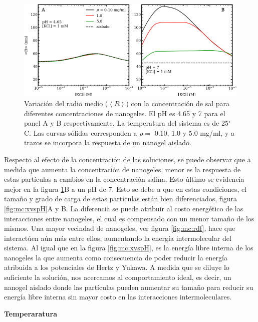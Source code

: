 	\begin{figure}
		\centering
		\includegraphics[width=0.75\linewidth]{Figures/graph-mc/r-salts-pHs.pdf}
		\caption{Variaci\'on del radio medio ($\left<R\right>$) con la concentraci\'on de sal para diferentes concentraciones de nanogeles. El pH es 4.65 y 7 para el panel A y B respectivamente. La temperatura del sistema es de 25$^\circ$C. Las curvas s\'olidas corresponden a $\rho=$ 0.10, 1.0 y 5.0 mg/ml, y a trazos se incorpora la respuesta de un nanogel aislado.}
		\label{fig:mc:reentrante}
	\end{figure}
	
	Respecto al efecto de la concentraci\'on de las soluciones, se puede observar que a medida que aumenta la concentraci\'on de nanogeles, menor es la respuesta de estas part\'iculas a cambios en la concentraci\'on salina. Esto \'ultimo se evidencia mejor en la figura \ref{fig:mc:reentrante}B a un pH de 7. Esto se debe a que en estas condiciones, el tama\~no y grado de carga de estas part\'iculas est\'an bien diferenciados, figura \ref{fig:mc:xvspH}A y B. La diferencia se puede atribuir al costo energ\'etico de las interacciones entre nanogeles, el cual es compensado con un menor tama\~no de los mismos. Una mayor vecindad de nanogeles, ver figura \ref{fig:mc:rdf}, hace que interact\'uen a\'un m\'as entre ellos, aumentando la energ\'ia intermolecular del sistema. Al igual que en la figura \ref{fig:mc:xvspH}, es la energ\'ia libre interna de los nanogeles la que aumenta como consecuencia de poder reducir la energ\'ia atribuida a los potenciales de Hertz y Yukawa. A medida que se diluye lo suficiente la soluci\'on, nos acercamos al comportamiento ideal, es decir, un nanogel aislado donde las part\'iculas pueden aumentar su tama\~no para reducir su energ\'ia libre interna sin mayor costo en las interacciones intermoleculares.
	
	
	\textbf{Temperaratura}

